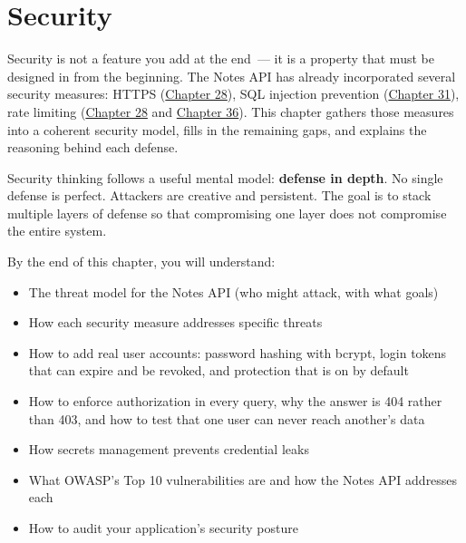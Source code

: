 \setcounter{chapter}{37}
\chapter{Security}\label{ch:38-security}

\chapterrule

Security is not a feature you add at the end~--- it is a property that must be designed in from the beginning. The Notes API has already incorporated several security measures: HTTPS (\hyperref[ch:28-traffic-routing]{Chapter 28}), SQL injection prevention (\hyperref[ch:31-input-handling]{Chapter 31}), rate limiting (\hyperref[ch:28-traffic-routing]{Chapter 28} and \hyperref[ch:36-scaling-load]{Chapter 36}). This chapter gathers those measures into a coherent security model, fills in the remaining gaps, and explains the reasoning behind each defense.

Security thinking follows a useful mental model: \textbf{defense in depth}. No single defense is perfect. Attackers are creative and persistent. The goal is to stack multiple layers of defense so that compromising one layer does not compromise the entire system.

\begin{objectives}

By the end of this chapter, you will understand:

\begin{itemize}
\tightlist
\item
  The threat model for the Notes API (who might attack, with what goals)
\item
  How each security measure addresses specific threats
\item
  How to add real user accounts: password hashing with bcrypt, login tokens that can expire and be revoked, and protection that is on by default
\item
  How to enforce authorization in every query, why the answer is 404 rather than 403, and how to test that one user can never reach another's data
\item
  How secrets management prevents credential leaks
\item
  What OWASP's Top 10 vulnerabilities are and how the Notes API addresses each
\item
  How to audit your application's security posture
\end{itemize}

\end{objectives}

\setcounter{section}{0}
